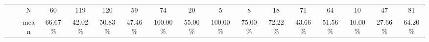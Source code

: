 \documentclass{sigchi}
\begin{document}
\begin{table}[t]
\begin{adjustbox}{width=1\textwidth}
\begin{tabular}{ccccccccccccccccc}
			\multicolumn{1}{|c|}{}                               & \multicolumn{1}{c|}{}                        & \multicolumn{1}{c|}{N}     & \multicolumn{1}{c|}{\cellcolor[HTML]{ACDDAA}60}           & \multicolumn{1}{c|}{\cellcolor[HTML]{ACDDAA}119}         & \multicolumn{1}{c|}{120}                                  & \multicolumn{1}{c|}{59}                                  & \multicolumn{1}{c|}{\cellcolor[HTML]{ACDDAA}74}                & \multicolumn{1}{c|}{\cellcolor[HTML]{ACDDAA}20}             & \multicolumn{1}{c|}{\cellcolor[HTML]{ACDDAA}5}        & \multicolumn{1}{c|}{\cellcolor[HTML]{ACDDAA}8}       & \multicolumn{1}{c|}{\cellcolor[HTML]{ACDDAA}18}      & \multicolumn{1}{c|}{\cellcolor[HTML]{ACDDAA}71}      & \multicolumn{1}{c|}{\cellcolor[HTML]{ACDDAA}64}      & \multicolumn{1}{c|}{\cellcolor[HTML]{ACDDAA}10}      & \multicolumn{1}{c|}{\cellcolor[HTML]{ACDDAA}47}           & \multicolumn{1}{c|}{\cellcolor[HTML]{ACDDAA}81}          \\ \cline{3-17} 
			\multicolumn{1}{|c|}{}                               & \multicolumn{1}{c|}{}                        & \multicolumn{1}{c|}{mean}  & \multicolumn{1}{c|}{\cellcolor[HTML]{ACDDAA}66.67\%}      & \multicolumn{1}{c|}{\cellcolor[HTML]{ACDDAA}42.02\%}     & \multicolumn{1}{c|}{50.83\%}                              & \multicolumn{1}{c|}{47.46\%}                             & \multicolumn{1}{c|}{\cellcolor[HTML]{ACDDAA}100.00\%}          & \multicolumn{1}{c|}{\cellcolor[HTML]{ACDDAA}55.00\%}        & \multicolumn{1}{c|}{\cellcolor[HTML]{ACDDAA}100.00\%} & \multicolumn{1}{c|}{\cellcolor[HTML]{ACDDAA}75.00\%} & \multicolumn{1}{c|}{\cellcolor[HTML]{ACDDAA}72.22\%} & \multicolumn{1}{c|}{\cellcolor[HTML]{ACDDAA}43.66\%} & \multicolumn{1}{c|}{\cellcolor[HTML]{ACDDAA}51.56\%} & \multicolumn{1}{c|}{\cellcolor[HTML]{ACDDAA}10.00\%} & \multicolumn{1}{c|}{\cellcolor[HTML]{ACDDAA}27.66\%}      & \multicolumn{1}{c|}{\cellcolor[HTML]{ACDDAA}64.20\%}     \\ \cline{3-17} 

\end{tabular}
\end{adjustbox}
\end{table}
\end{document}

